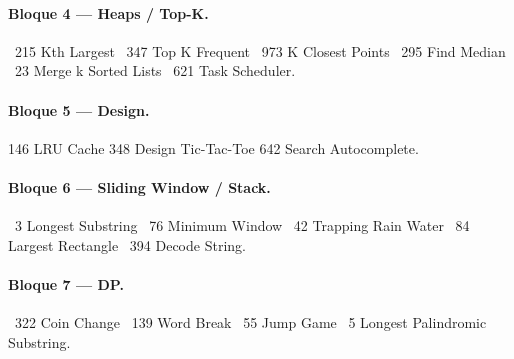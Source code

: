 \paragraph{Bloque 4 — Heaps / Top-K.}
\checkmark\ 215 Kth Largest \textbullet{} \checkmark\ 347 Top K Frequent \textbullet{}
\checkmark\ 973 K Closest Points \textbullet{} \checkmark\ 295 Find Median \textbullet{}
\checkmark\ 23 Merge k Sorted Lists \textbullet{} \checkmark\ 621 Task Scheduler.

\paragraph{Bloque 5 — Design.}
146 LRU Cache \textbullet{} 348 Design Tic-Tac-Toe \textbullet{}
642 Search Autocomplete.

\paragraph{Bloque 6 — Sliding Window / Stack.}
\checkmark\ 3 Longest Substring \textbullet{} \checkmark\ 76 Minimum Window \textbullet{}
\checkmark\ 42 Trapping Rain Water \textbullet{} \checkmark\ 84 Largest Rectangle \textbullet{}
\checkmark\ 394 Decode String.

\paragraph{Bloque 7 — DP.}
\checkmark\ 322 Coin Change \textbullet{} \checkmark\ 139 Word Break \textbullet{}
\checkmark\ 55 Jump Game \textbullet{} \checkmark\ 5 Longest Palindromic Substring.
